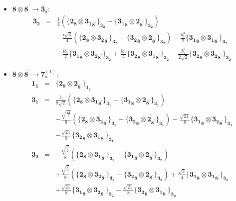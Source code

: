\documentclass[english]{article}
\newcommand{\subcg}[3]{\big\{ {#1}\otimes{#2}\big\}^{}_{#3}}
\newcommand{\rep}[1]{\mathbf{#1}}
\begin{document}
\begin{itemize}
\begin{eqnarray*}
\end{eqnarray*}
\item $\rep{8}\otimes\rep{8}^{\prime}\to\rep{\bar{3}}_{a}$:
\begin{eqnarray*}
\rep{3_2} &=& \frac{1}{4}\left(\subcg{\rep{2}_{\rep{8}}}{\rep{3_1}_{\rep{8}^{\prime}}}{\rep{3_2}}-\subcg{\rep{3_1}_{\rep{8}}}{\rep{2}_{\rep{8}^{\prime}}}{\rep{3_2}}\right) \\ 
 & & -\frac{i \sqrt{3}}{4}\left(\subcg{\rep{2}_{\rep{8}}}{\rep{3_2}_{\rep{8}^{\prime}}}{\rep{3_2}}-\subcg{\rep{3_2}_{\rep{8}}}{\rep{2}_{\rep{8}^{\prime}}}{\rep{3_2}}\right)-\frac{b_7^3}{2}\subcg{\rep{3_1}_{\rep{8}}}{\rep{3_1}_{\rep{8}^{\prime}}}{\rep{3_2}} \\ 
 & & -\frac{i b_7}{4}\subcg{\rep{3_1}_{\rep{8}}}{\rep{3_2}_{\rep{8}^{\prime}}}{\rep{3_2}}+\frac{i b_7}{4}\subcg{\rep{3_2}_{\rep{8}}}{\rep{3_1}_{\rep{8}^{\prime}}}{\rep{3_2}}-\frac{b_7^2}{2 \sqrt{2}}\subcg{\rep{3_2}_{\rep{8}}}{\rep{3_2}_{\rep{8}^{\prime}}}{\rep{3_2}}
\end{eqnarray*}
\item $\rep{8}\otimes\rep{8}^{\prime}\to\rep{7}_{a}^{(1)}$:
\begin{eqnarray*}
\rep{1_1} &=& \subcg{\rep{2}_{\rep{8}}}{\rep{2}_{\rep{8}^{\prime}}}{\rep{1_1}}
\\
\rep{3_1} &=& \frac{1}{8 \sqrt{2}}\left(\subcg{\rep{2}_{\rep{8}}}{\rep{3_1}_{\rep{8}^{\prime}}}{\rep{3_1}}-\subcg{\rep{3_1}_{\rep{8}}}{\rep{2}_{\rep{8}^{\prime}}}{\rep{3_1}}\right) \\ 
 & & -\frac{\sqrt{\frac{21}{2}}}{8}\left(\subcg{\rep{2}_{\rep{8}}}{\rep{3_2}_{\rep{8}^{\prime}}}{\rep{3_1}}-\subcg{\rep{3_2}_{\rep{8}}}{\rep{2}_{\rep{8}^{\prime}}}{\rep{3_1}}\right)-\frac{\sqrt{21}}{8}\subcg{\rep{3_1}_{\rep{8}}}{\rep{3_2}_{\rep{8}^{\prime}}}{\rep{3_1}} \\ 
 & & -\frac{\sqrt{21}}{8}\subcg{\rep{3_2}_{\rep{8}}}{\rep{3_1}_{\rep{8}^{\prime}}}{\rep{3_1}}
\\
\rep{3_2} &=& -\frac{\sqrt{\frac{3}{2}}}{8}\left(\subcg{\rep{2}_{\rep{8}}}{\rep{3_1}_{\rep{8}^{\prime}}}{\rep{3_2}}-\subcg{\rep{3_1}_{\rep{8}}}{\rep{2}_{\rep{8}^{\prime}}}{\rep{3_2}}\right) \\ 
 & & +\frac{\sqrt{\frac{7}{2}}}{8}\left(\subcg{\rep{2}_{\rep{8}}}{\rep{3_2}_{\rep{8}^{\prime}}}{\rep{3_2}}-\subcg{\rep{3_2}_{\rep{8}}}{\rep{2}_{\rep{8}^{\prime}}}{\rep{3_2}}\right)+\frac{\sqrt{3}}{4}\subcg{\rep{3_1}_{\rep{8}}}{\rep{3_1}_{\rep{8}^{\prime}}}{\rep{3_2}} \\ 
 & & +\frac{\sqrt{21}}{8}\subcg{\rep{3_1}_{\rep{8}}}{\rep{3_2}_{\rep{8}^{\prime}}}{\rep{3_2}}-\frac{\sqrt{21}}{8}\subcg{\rep{3_2}_{\rep{8}}}{\rep{3_1}_{\rep{8}^{\prime}}}{\rep{3_2}}

\end{eqnarray*}
\end{itemize}
\end{document}
